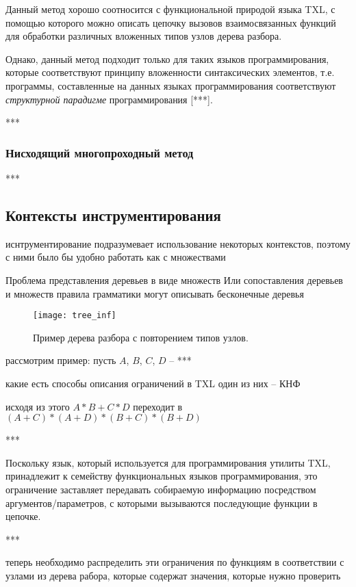Данный метод хорошо соотносится с функциональной природой языка TXL, с помощью которого можно описать цепочку вызовов взаимосвязанных функций для обработки различных вложенных типов узлов дерева разбора.

Однако, данный метод подходит только для таких языков программирования, которые соответствуют принципу вложенности синтаксических элементов, т.е. программы, составленные на данных языках программирования соответствуют \textit{структурной парадигме} программирования [***].

***

\subsubsection{Нисходящий многопроходный метод}

***

\subsection{Контексты инструментирования}

иснтрументирование подразумевает использование некоторых контекстов, поэтому с ними было бы удобно работать как с множествами

Проблема представления деревьев в виде множеств
Или сопоставления деревьев и множеств
правила грамматики могут описывать бесконечные деревья

\begin{figure}[H]
	\centering
	\texttt{[image: tree\_inf]}
	\caption{Пример дерева разбора с повторением типов узлов.}
	\label{fig:tree_inf}
\end{figure}

рассмотрим пример: пусть $A$, $B$, $C$, $D$ -- ***

какие есть способы описания ограничений в TXL
один из них -- КНФ

исходя из этого
$A * B + C * D$
переходит в
$(A + C) * (A + D) * (B + C) * (B + D)$

***

Поскольку язык, который используется для программирования утилиты TXL, принадлежит к семейству функциональных языков программирования, это ограничение заставляет передавать собираемую информацию посредством аргументов/параметров, с которыми вызываются последующие функции в цепочке.

***

теперь необходимо распределить эти ограничения по функциям в соответствии с узлами из дерева рабора, которые содержат значения, которые нужно проверить

